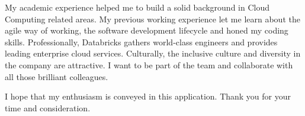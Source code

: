 \documentclass[11pt, a4paper]{awesome-cv}
\begin{document}
\begin{cvletter}
My academic experience helped me to build a solid background in Cloud Computing related areas.  My previous working experience let me learn about the agile way of working, the software development lifecycle and honed my coding skills. Professionally, Databricks gathers world-class engineers and provides leading enterprise cloud services. Culturally,  the inclusive culture and diversity in the company are attractive. I want to be part of the team and collaborate with all those brilliant colleagues.

I hope that my enthusiasm is conveyed in this application. Thank you for your time and consideration. 


\end{cvletter}


\makeletterclosing
\end{document}
